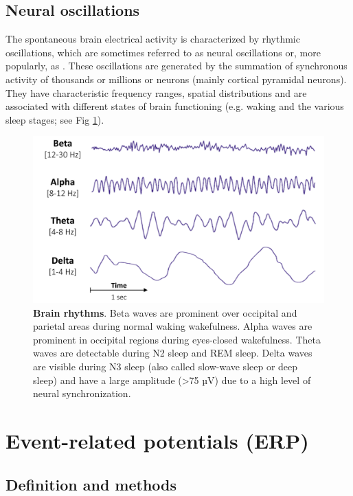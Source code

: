 \subsection{Neural oscillations}
\label{sec:eeg:eeg:neural}

The spontaneous brain electrical activity is characterized by rhythmic oscillations, which are sometimes referred to as neural oscillations or, more popularly, as . These oscillations are generated by the summation of synchronous activity of thousands or millions or neurons (mainly cortical pyramidal neurons). They have characteristic frequency ranges, spatial distributions and are associated with different states of brain functioning (e.g. waking and the various sleep stages; see Fig \ref{fig:methods:neural}).

\begin{figure}[htb]
	\includegraphics[width=\textwidth]{Fig/Methods/EEG_BrainWaves/EEG_Brain_Waves.png}
	\caption[Brain rhythms]{\textbf{Brain rhythms}. Beta waves are prominent over occipital and parietal areas during normal waking wakefulness. Alpha waves are prominent in occipital regions during eyes-closed wakefulness. Theta waves are detectable during N2 sleep and REM sleep. Delta waves are visible during N3 sleep (also called slow-wave sleep or deep sleep) and have a large amplitude (>75 µV) due to a high level of neural synchronization.}
	\label{fig:methods:neural}
\end{figure}

\section{Event-related potentials (ERP)}
\label{sec:eeg:erp}

\subsection{Definition and methods}
\label{sec:eeg:erp:def}

